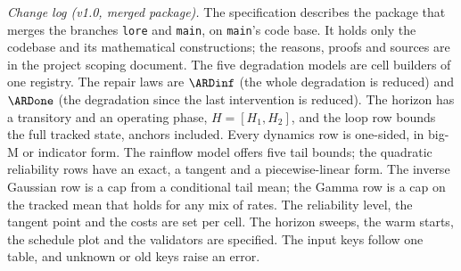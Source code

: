 \emph{Change log (v1.0, merged package).}
The specification describes the package that merges the branches \texttt{lore}
and \texttt{main}, on \texttt{main}'s code base. It holds only the codebase and its
mathematical constructions; the reasons, proofs and sources are in the project
scoping document. The five degradation models are cell builders of one registry.
The repair laws are $\ARDinf$ (the whole degradation is reduced) and $\ARDone$
(the degradation since the last intervention is reduced). The horizon has a
transitory and an operating phase, $H = [H_1, H_2]$, and the loop row bounds the
full tracked state, anchors included. Every dynamics row is one-sided, in big-M
or indicator form. The rainflow model offers five tail bounds; the quadratic
reliability rows have an exact, a tangent and a piecewise-linear form. The
inverse Gaussian row is a cap from a conditional tail mean; the Gamma row is a
cap on the tracked mean that holds for any mix of rates. The reliability level,
the tangent point and the costs are set per cell. The horizon sweeps, the warm
starts, the schedule plot and the validators are specified. The input keys follow
one table, and unknown or old keys raise an error.
